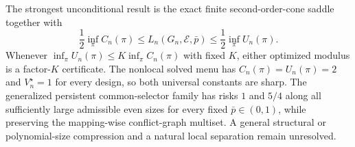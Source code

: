 The strongest unconditional result is the exact finite second-order-cone saddle together with
\[
 \frac12\inf_\pi C_n(\pi)
 \le L_n(G_n,\mathcal E,\bar p)
 \le\frac12\inf_\pi U_n(\pi).
\]
Whenever \(\inf_\pi U_n(\pi)\le K\inf_\pi C_n(\pi)\) with fixed \(K\), either optimized modulus is a factor-\(K\) certificate.  The nonlocal solved menu has \(C_n(\pi)=U_n(\pi)=2\) and \(V_n^\star=1\) for every design, so both universal constants are sharp.  The generalized persistent common-selector family has risks \(1\) and \(5/4\) along all sufficiently large admissible even sizes for every fixed \(\bar p\in(0,1)\), while preserving the mapping-wise conflict-graph multiset.  A general structural or polynomial-size compression and a natural local separation remain unresolved.